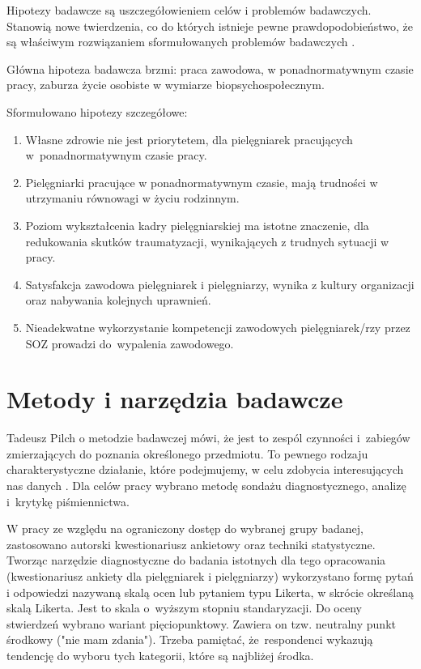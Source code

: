 \documentclass[a4paper,12pt,twoside,openright]{mwrep}
\begin{document}
Hipotezy badawcze są uszczegółowieniem celów i problemów badawczych. Stanowią nowe twierdzenia, co do których istnieje pewne prawdopodobieństwo, że są właściwym rozwiązaniem sformułowanych problemów badawczych \cite{janusz}.


Główna hipoteza badawcza brzmi: praca zawodowa, w ponadnormatywnym czasie pracy, zaburza życie osobiste w wymiarze biopsychospołecznym.

Sformułowano hipotezy szczegółowe:
\begin{enumerate}
	\item Własne zdrowie nie jest priorytetem, dla pielęgniarek pracujących w~ponadnormatywnym czasie pracy.
	\item Pielęgniarki pracujące w ponadnormatywnym czasie, mają  trudności w utrzymaniu równowagi w życiu  rodzinnym. 
	\item Poziom wykształcenia kadry pielęgniarskiej ma istotne znaczenie, dla redukowania skutków traumatyzacji, wynikających z trudnych sytuacji w pracy.
	\item Satysfakcja zawodowa pielęgniarek i pielęgniarzy, wynika z kultury organizacji oraz nabywania kolejnych uprawnień.
	\item Nieadekwatne wykorzystanie kompetencji zawodowych pielęgniarek/rzy  przez SOZ prowadzi do~wypalenia zawodowego.
\end{enumerate}

\section{Metody i narzędzia badawcze}
Tadeusz Pilch o metodzie badawczej mówi, że jest to zespól czynności i~zabiegów zmierzających do poznania określonego przedmiotu. To pewnego rodzaju charakterystyczne działanie, które podejmujemy, w celu zdobycia interesujących nas danych \cite{tadeusz}. Dla celów pracy wybrano metodę sondażu diagnostycznego, analizę i~krytykę piśmiennictwa.\cite{krys}

W pracy ze względu na ograniczony dostęp do wybranej grupy badanej, zastosowano autorski kwestionariusz ankietowy oraz techniki statystyczne.
Tworząc narzędzie diagnostyczne do badania istotnych dla tego opracowania (kwestionariusz ankiety dla pielęgniarek i pielęgniarzy) wykorzystano formę pytań i odpowiedzi nazywaną skalą ocen lub pytaniem typu Likerta, w skrócie określaną skalą Likerta. Jest to skala o~wyższym stopniu standaryzacji. Do oceny stwierdzeń wybrano wariant pięciopunktowy. Zawiera on tzw. neutralny punkt środkowy ("nie mam zdania"). Trzeba pamiętać, że~respondenci wykazują tendencję do wyboru tych kategorii, które są najbliżej środka.
\end{document}
